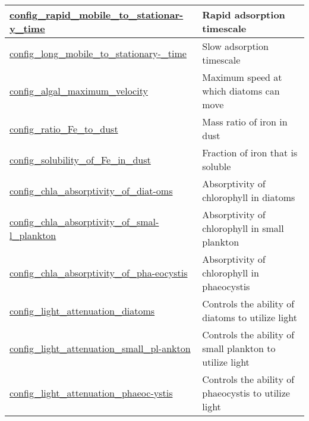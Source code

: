 {\begin{center}
\begin{longtable}{| p{2.0in} || p{4.0in} |}
    \hline
    \hyperref[subsec:nm_sec_config_rapid_mobile_to_stationary_time]{config\_rapid\_mobile\_to\_stationar-}\hyperref[subsec:nm_sec_config_rapid_mobile_to_stationary_time]{y\_time}& Rapid adsorption timescale   \\
    \hline
    \hyperref[subsec:nm_sec_config_long_mobile_to_stationary_time]{config\_long\_mobile\_to\_stationary-}\hyperref[subsec:nm_sec_config_long_mobile_to_stationary_time]{\_time}& Slow adsorption timescale \\
    \hline
    \hyperref[subsec:nm_sec_config_algal_maximum_velocity]{config\_algal\_maximum\_velocity} & Maximum speed at which diatoms can move \\
    \hline
    \hyperref[subsec:nm_sec_config_ratio_Fe_to_dust]{config\_ratio\_Fe\_to\_dust} & Mass ratio of iron in dust \\
    \hline
    \hyperref[subsec:nm_sec_config_solubility_of_Fe_in_dust]{config\_solubility\_of\_Fe\_in\_dust} & Fraction of iron that is soluble \\
    \hline
    \hyperref[subsec:nm_sec_config_chla_absorptivity_of_diatoms]{config\_chla\_absorptivity\_of\_diat-}\hyperref[subsec:nm_sec_config_chla_absorptivity_of_diatoms]{oms}& Absorptivity of chlorophyll in diatoms \\
    \hline
    \hyperref[subsec:nm_sec_config_chla_absorptivity_of_small_plankton]{config\_chla\_absorptivity\_of\_smal-}\hyperref[subsec:nm_sec_config_chla_absorptivity_of_small_plankton]{l\_plankton}& Absorptivity of chlorophyll in small plankton \\
    \hline
    \hyperref[subsec:nm_sec_config_chla_absorptivity_of_phaeocystis]{config\_chla\_absorptivity\_of\_pha-}\hyperref[subsec:nm_sec_config_chla_absorptivity_of_phaeocystis]{eocystis}& Absorptivity of chlorophyll in phaeocystis \\
    \hline
    \hyperref[subsec:nm_sec_config_light_attenuation_diatoms]{config\_light\_attenuation\_diatoms} & Controls the ability of diatoms to utilize light \\
    \hline
    \hyperref[subsec:nm_sec_config_light_attenuation_small_plankton]{config\_light\_attenuation\_small\_pl-}\hyperref[subsec:nm_sec_config_light_attenuation_small_plankton]{ankton}& Controls the ability of small plankton to utilize light \\
    \hline
    \hyperref[subsec:nm_sec_config_light_attenuation_phaeocystis]{config\_light\_attenuation\_phaeoc-}\hyperref[subsec:nm_sec_config_light_attenuation_phaeocystis]{ystis}& Controls the ability of phaeocystis to utilize light \\

\end{longtable}
\end{center}}
